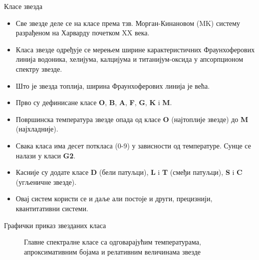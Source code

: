 \documentclass[aspectratio=169, xcolor=table, 10pt]{beamer}
\begin{document}
\begin{frame}{Класе звезда}
  \begin{itemize}
    \item Све звезде деле се на класе према тзв. Морган-Кинановом (MK) систему разрађеном на Харварду почетком XX века.\cite{britannica1}
    \item Класа звезде одређује се мерењем ширине карактеристичних Фраунхоферових линија водоника, хелијума, калцијума и титанијум-оксида у апсорпционом спектру звезде.
    \item Што је звезда топлија, ширина Фраунхоферових линија је већа.
    \item Прво су дефинисане класе \textbf{O}, \textbf{B}, \textbf{A}, \textbf{F}, \textbf{G}, \textbf{K} i \textbf{M}.
    \item Површинска температура звезде опада од класе \textbf{O} (најтоплије звезде) до \textbf{M} (најхладније).
    \item Свака класа има десет поткласа (0-9) у зависности од температуре. Сунце се налази у класи \textbf{G2}.
    \item Касније су додате класе \textbf{D} (бели патуљци), \textbf{L} i \textbf{T} (смеђи патуљци), \textbf{S} i \textbf{C} (угљеничне звезде).
    \item Овај систем користи се и даље али постоје и други, прецизнији, квантитативни системи.
  \end{itemize}
\end{frame}

\begin{frame}{Графички приказ звезданих класа}
  \begin{figure}
    \centering
    \captionsetup{width=\wd0}
    \caption{Главне спектралне класе са одговарајућим температурама, апроксимативним бојама и релативним величинама звезде}
  \end{figure}
\end{frame}
\end{document}
